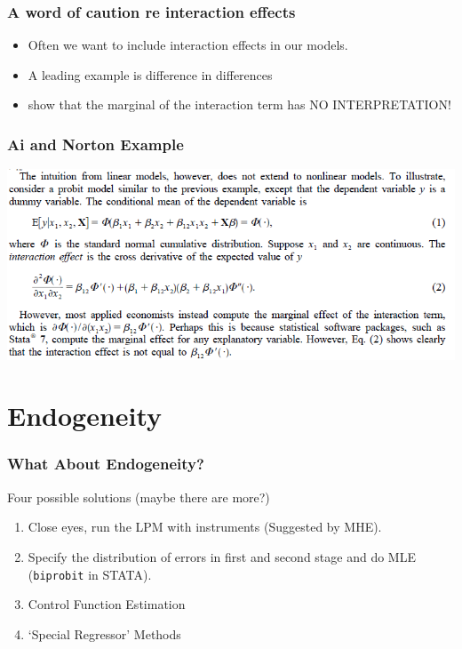 \begin{frame}
       \frametitle{A word of caution re interaction effects}
       \begin{itemize}
       \item Often we want to include interaction effects in our models. 
       \item A leading example is difference in differences 
       \item \citet{ai2003interaction} show that the marginal of the interaction term has NO INTERPRETATION!
       \end{itemize}
\end{frame}

\begin{frame}
       \frametitle{Ai and Norton Example}
       \begin{center}
       \includegraphics[width=\textwidth]{resources/AiSimple}
       \end{center}
\end{frame}

\section{Endogeneity}

\begin{frame}
\frametitle{What About Endogeneity?}
Four possible solutions (maybe there are more?)
\begin{enumerate}
\item Close eyes, run the LPM with instruments (Suggested by MHE).
\item Specify the distribution of errors in first and second stage and do MLE (\texttt{biprobit} in STATA).
\item Control Function Estimation
\item `Special Regressor' Methods
\end{enumerate}
\end{frame}

